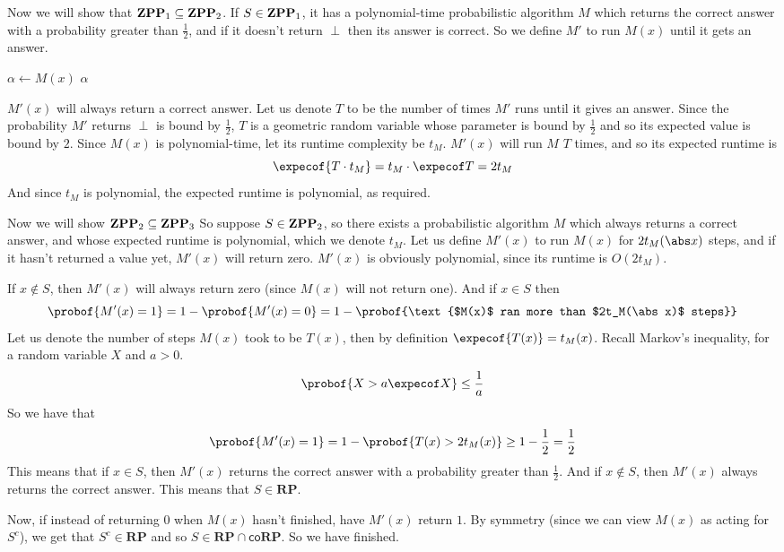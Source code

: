 \documentclass[10pt]{article}
\def\co{\mathsf{co}}
\def\RP{\mathbf{RP}}
\begin{document}
Now we will show that $\mathbf{ZPP}_1\subseteq\mathbf{ZPP}_2$.
If $S\in\mathbf{ZPP}_1$, it has a polynomial-time probabilistic algorithm $M$ which returns the correct answer with a probability greater than $\frac12$, and if it doesn't return $\perp$ then its answer is correct.
So we define $M'$ to run $M(x)$ until it gets an answer.

\algorithm
            \State $\alpha\gets M(x)$
            \lIf{$\alpha\neq\perp$} \Return $\alpha$
        \EndWhile
    \EndFunc
\ealgorithm

$M'(x)$ will always return a correct answer.
Let us denote $T$ to be the number of times $M'$ runs until it gives an answer.
Since the probability $M'$ returns $\perp$ is bound by $\frac12$, $T$ is a geometric random variable whose parameter is bound by $\frac12$ and so its expected value is bound by $2$.
Since $M(x)$ is polynomial-time, let its runtime complexity be $t_M$.
$M'(x)$ will run $M$ $T$ times, and so its expected runtime is
\[ \expecof{T\cdot t_M}=t_M\cdot\expecof T= 2t_M \]
And since $t_M$ is polynomial, the expected runtime is polynomial, as required.

Now we will show $\mathbf{ZPP}_2\subseteq\mathbf{ZPP}_3$
So suppose $S\in\mathbf{ZPP}_2$, so there exists a probabilistic algorithm $M$ which always returns a correct answer, and whose expected runtime is polynomial, which we denote $t_M$.
Let us define $M'(x)$ to run $M(x)$ for $2t_M(\abs x)$ steps, and if it hasn't returned a value yet, $M'(x)$ will return zero.
$M'(x)$ is obviously polynomial, since its runtime is $O(2t_M)$.

If $x\notin S$, then $M'(x)$ will always return zero (since $M(x)$ will not return one).
And if $x\in S$ then
\[ \probof{M'(x)=1} = 1 - \probof{M'(x)=0} = 1 - \probof{\text{$M(x)$ ran more than $2t_M(\abs x)$ steps}} \]
Let us denote the number of steps $M(x)$ took to be $T(x)$, then by definition $\expecof{T(x)}=t_M(x)$.
Recall Markov's inequality, for a random variable $X$ and $a>0$.
\[ \probof{X>a\expecof X} \leq \frac1a \]
So we have that
\[ \probof{M'(x)=1} = 1 - \probof{T(x)>2t_M(x)} \geq 1-\frac12 = \frac12 \]
This means that if $x\in S$, then $M'(x)$ returns the correct answer with a probability greater than $\frac12$.
And if $x\notin S$, then $M'(x)$ always returns the correct answer.
This means that $S\in\RP$.

Now, if instead of returning $0$ when $M(x)$ hasn't finished, have $M'(x)$ return $1$.
By symmetry (since we can view $M(x)$ as acting for $S^c$), we get that $S^c\in\RP$ and so $S\in\RP\cap\co\RP$.
So we have finished.
\end{document}
